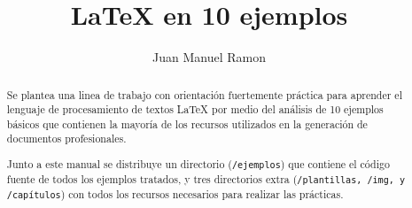 \documentclass[a4paper]{./ejemplos/plantillas/llncs}
\begin{document}
\mainmatter  %

\title{LaTeX en 10 ejemplos}


%
%
\author{Juan Manuel Ramon}
%


%
%

\maketitle


\begin{abstract}
Se plantea una linea de trabajo con orientación fuertemente práctica para aprender el lenguaje de procesamiento de textos LaTeX por medio del análisis de 10 ejemplos básicos que contienen la mayoría de los recursos utilizados en la generación de documentos profesionales.

Junto a este manual se distribuye un directorio (\verb+/ejemplos+) que contiene el código fuente de todos los ejemplos tratados, y tres directorios extra (\verb+/plantillas, /img, y /capítulos+) con todos los recursos necesarios para realizar las prácticas.

\end{abstract}
\end{document}
